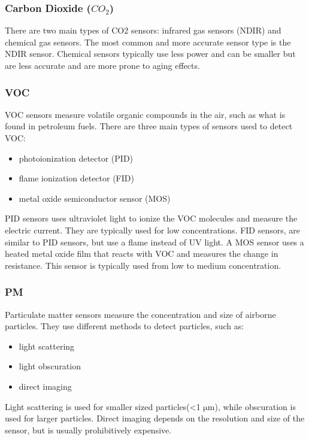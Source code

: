 \subsubsection{Carbon Dioxide ($CO_2$)}
There are two main types of CO2 sensors: infrared gas sensors (NDIR) and chemical gas sensors. \cite{disruptive:co2sensor}
The most common and more accurate sensor type is the NDIR sensor. Chemical sensors typically use less power and can be smaller but are less accurate and are more prone to aging effects.

\subsubsection{VOC}
VOC sensors measure volatile organic compounds in the air, such as what is found in petroleum fuels. There are three main types of sensors used to detect VOC\cite{ourpcb:vocsensor}\cite{utmel:vocsensor}:

\begin{itemize}
	\item photoionization detector (PID)
	\item flame ionization detector (FID)
	\item metal oxide semiconductor sensor (MOS)
\end{itemize}
PID sensors uses ultraviolet light to ionize the VOC molecules and measure the electric current. They are typically used for low concentrations.
FID sensors, are similar to PID sensors, but use a flame instead of UV light.
A MOS sensor uses a heated metal oxide film that reacts with VOC and measures the change in resistance. This sensor is typically used from low to medium concentration.\cite{ourpcb:vocsensor}\cite{utmel:vocsensor} 




\subsubsection{PM}
Particulate matter sensors measure the concentration and size of airborne particles. They use different methods to detect particles, such as:
\begin{itemize}
	\item light scattering
	\item light obscuration
	\item direct imaging
\end{itemize}
Light scattering is used for smaller sized particles(<1 $ \si{\micro\meter} $), while obscuration is used for larger particles\cite{thomasnet:particlesensor}. Direct imaging depends on the resolution and size of the sensor, but is usually prohibitively expensive.

